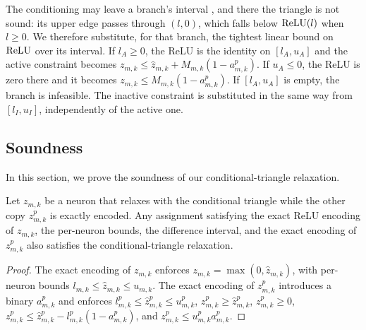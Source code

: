 {The conditioning may leave a branch's interval , and there the triangle is not
sound: its upper edge passes through $(l,0)$, which falls below $\mathrm{ReLU}(l)$ when
$l\ge 0$. We therefore substitute, for that branch, the tightest linear bound on $\mathrm{ReLU}$
over its interval. If $l_A\ge 0$, the ReLU is the identity on $[l_A,u_A]$ and the active
constraint becomes $z_{m,k}\le \hat z_{m,k}+M_{m,k}(1-a^{p}_{m,k})$. If $u_A\le 0$, the
ReLU is zero there and it becomes $z_{m,k}\le M_{m,k}(1-a^{p}_{m,k})$. If $[l_A,u_A]$
is empty, the branch is infeasible. The inactive constraint is substituted in the same way
from $[l_I,u_I]$, independently of the active one.


\subsection{Soundness}
\label{sec:blend-condtri-soundness}

{\sloppy

In this section, we prove the soundness of our conditional-triangle relaxation.

\begin{lemma}\label{lem:cond-tri-feasible}
Let $z_{m,k}$ be a neuron that \tool relaxes with the conditional triangle while the
other copy $z^{p}_{m,k}$ is exactly encoded. Any assignment satisfying the exact ReLU
encoding of $z_{m,k}$, the per-neuron bounds, the difference interval, and the exact
encoding of $z^{p}_{m,k}$ also satisfies the conditional-triangle relaxation.
\end{lemma}

\begin{proof}
The exact encoding of $z_{m,k}$ enforces $z_{m,k}=\max(0,\hat z_{m,k})$, with per-neuron
bounds $l_{m,k}\leq \hat z_{m,k}\leq u_{m,k}$. The exact encoding of $z^{p}_{m,k}$
introduces a binary $a^{p}_{m,k}$ and enforces
$l^{p}_{m,k}\leq \hat z^{p}_{m,k}\leq u^{p}_{m,k}$, $z^{p}_{m,k}\geq \hat z^{p}_{m,k}$,
$z^{p}_{m,k}\geq 0$, $z^{p}_{m,k}\leq \hat z^{p}_{m,k}-l^{p}_{m,k}(1-a^{p}_{m,k})$, and
$z^{p}_{m,k}\leq u^{p}_{m,k}a^{p}_{m,k}$.


\end{proof}}}
